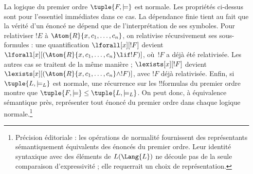 \documentclass[../../../include/open-logic-section]{subfiles}
\begin{document}
\begin{rem}
La logique du premier ordre
$\tuple{F,\models}$ est normale.
Les propriétés ci-dessus sont
pour l'essentiel immédiates dans
ce cas. La dépendance finie tient
au fait que la vérité d'un énoncé
ne dépend que de l'interprétation
de ses symboles. Pour relativiser
$!E$ à $\Atom{R}{x,c_1,\dots,c_n}$,
on relativise récursivement ses
sous-formules : une quantification
$\lforall[x][!F]$ devient
$\lforall[x][(\Atom{R}{x,c_1,\dots,c_n}
\lif !F)]$, où~$!F$ a déjà été
relativisée. Les autres cas se
traitent de la même manière ; $\lexists[x][!F]$ devient $\lexists[x][(\Atom{R}{x,c_1,\dots,c_n}\land !F)]$, avec $!F$ déjà relativisée.
Enfin, si $\tuple{L,\models_L}$
est normale, une récurrence sur
les !!{formula}s du premier ordre
montre que
$\tuple{F,\models}\leq
\tuple{L,\models_L}$.
On peut donc, à équivalence
sémantique près, représenter
tout énoncé du premier ordre
dans chaque logique normale.\footnote{Précision éditoriale : les opérations de normalité fournissent des représentants sémantiquement équivalents des énoncés du premier ordre. Leur identité syntaxique avec des éléments de $L(\Lang{L})$ ne découle pas de la seule comparaison d'expressivité ; elle requerrait un choix de représentation.}
\end{rem}
\end{document}
